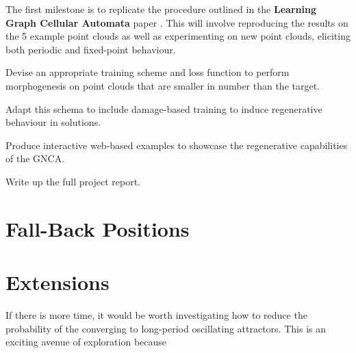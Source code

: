 The first milestone is to replicate the procedure outlined in the \textbf{Learning Graph Cellular Automata} paper \cite{grattarola2021learning}. This will involve reproducing the results on the 5 example point clouds as well as experimenting on new point clouds, eliciting both periodic and fixed-point behaviour.


    \item Devise an appropriate training scheme and loss function to perform morphogenesis on point clouds that are smaller in number than the target.
    \item Adapt this schema to include damage-based training to induce regenerative behaviour in solutions.
    \item Produce interactive web-based examples to showcase the 
    regenerative capabilities of the GNCA.
    \item Write up the full project report.
    
\section{Fall-Back Positions}

\section{Extensions}
If there is more time, it would be worth investigating how to reduce the probability of the converging to long-period oscillating attractors. This is an exciting avenue of exploration because 